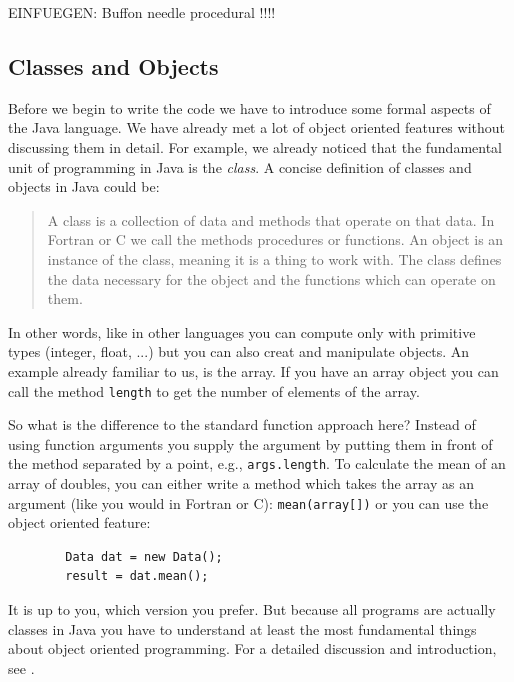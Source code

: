 EINFUEGEN: Buffon needle procedural !!!!



\subsection{Classes and Objects}
\label{sec:Classes_and_Objects}
Before we begin to write the code we have to introduce some formal
aspects of the Java language.
We have already met a lot of object oriented features 
without discussing them in detail.  For example, we already noticed
that the fundamental unit of programming in Java is the {\em class}. A
concise definition of classes and objects in Java could be:
\begin{quote}
A class is a collection of data and methods that operate on that data. In
Fortran or C we call the methods procedures or functions. An object
is an instance of the class, meaning it is a thing to work with. The class
defines the data necessary for the object and the functions which can
operate on them.   
\end{quote}


In other words, like in other languages you can compute only with
primitive types (integer, float, ...) but you can also creat and
manipulate objects. An example already familiar to us, is the  array. 
If you have an array 
object you can call the method \verb|length| to get the number of
elements of the array. 

So what is the difference to the standard function approach here?
Instead of using function arguments you supply the argument by 
putting them in front of the method separated by a point, e.g., 
\verb|args.length|. 
To calculate the mean of an array of doubles, you can
either write a method which takes the array as an argument (like you would
in Fortran or C): \verb|mean(array[])| or you can use the object
oriented feature: 
\begin{verbatim}
        Data dat = new Data(); 
        result = dat.mean();
\end{verbatim}
It is up to you, which version you prefer. But because all programs are
actually classes in Java you have to understand at least the 
most fundamental things about object oriented programming. For a detailed
discussion and introduction, see \cite{javanutshell}.

